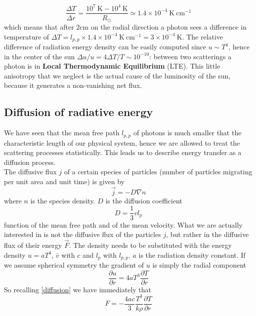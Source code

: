 $$
\frac{\Delta T}{\Delta r} = \frac{10^7 \ \mathrm{K}-10^4  \ \mathrm{K}}{R_{\odot}} \simeq 1.4 \times 10^{-4} \  \mathrm{K} \ \mathrm{cm} ^{-1}
$$
which means that after $2 \mathrm{cm}$ on the radial direction a photon sees a difference in temperature of $\Delta T = l_{p,p} \times 1.4 \times 10^{-4}  \  \mathrm{K} \ \mathrm{cm} ^{-1}= 3 \times 10^{-4} \  \mathrm{K}$. The relative difference of radiation energy density can be easily computed since $u \sim T^4$, hence in the center of the sun $\Delta u/u=4 \Delta T / T \sim 10^{-10}$: between two scatterings a photon is in \textbf{Local Thermodynamic Equilibrium} (LTE). This little anisotropy that we neglect is the actual cause of the luminosity of the sun, because it generates a non-vanishing net flux.
\subsection{Diffusion of radiative energy}
We have seen that the mean free path $l_{p,p}$ of photons is much smaller that the characteristic length of our physical system, hence we are allowed to treat the scattering processes statistically. This leads us to describe energy transfer as a diffusion process. \\
The diffusive flux $j$ of a certain species of particles (number of particles migrating per unit area and unit time) is given by
\begin{equation}\label{diffusion}
	\vec  j=-D \nabla n
\end{equation}
where $n$ is the species density. $D$ is the diffusion coefficient
\begin{equation}
	D =\frac{1}{3} v l_{p}
\end{equation}
function of the mean free path and of the mean velocity. What we are actually interested in is not the diffusive flux of the particles $j$, but rather in the diffusive flux of their energy $\vec F$. The density needs to be substituted with the energy density $u=aT^4$, $\bar v$ with $c$ and $l_p$ with $l_{p,p}$. $a$ is the radiation density constant. If we assume spherical symmetry the gradient of $u$ is simply the radial component
\begin{equation}
	\frac{\partial u}{\partial r} = 4  a  T^3   \frac{\partial T}{\partial r}
\end{equation}
So recalling \ref{diffusion} we have immediately that
\begin{equation}
	F=-\frac{4ac}{3}\frac{T^3}{k \rho} \frac{\partial T}{\partial r}
\end{equation}
